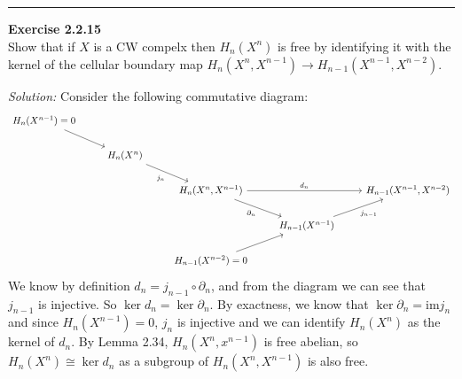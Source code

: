 \documentclass[a4paper, 12pt]{article}
\newenvironment{problem}[2][Exercise]
    { \begin{mdframed}[backgroundcolor=gray!20] \textbf{#1 #2} \\}
    {  \end{mdframed}}
\newenvironment{solution}
    {\textit{Solution:}}
    {}
\begin{document}
\noindent\rule{7in}{2.8pt}
\begin{problem}{2.2.15}
Show that if \(X\) is a CW compelx then \(H_n(X^n)\) is free by identifying it with the kernel of the cellular boundary map \(H_n(X^n,X^{n-1})\rightarrow H_{n-1}(X^{n-1},X^{n-2})\).	
\end{problem}
\begin{solution}
Consider the following commutative diagram:
\[\begin{tikzcd}
	{H_n(X^{n-1})=0} \\
	& {H_n(X^n)} \\
	&& {H_n(X^n,X^{n-1})} && {H_{n-1}(X^{n-1},X^{n-2})} \\
	&&& {H_{n-1}(X^{n-1})} \\
	&& {H_{n-1}(X^{n-2})=0}
	\arrow[from=1-1, to=2-2]
	\arrow["{j_n}"', from=2-2, to=3-3]
	\arrow["{d_n}", from=3-3, to=3-5]
	\arrow["{\partial_n}"', from=3-3, to=4-4]
	\arrow["{j_{n-1}}"', from=4-4, to=3-5]
	\arrow[from=5-3, to=4-4]
\end{tikzcd}\]
We know by definition \(d_n=j_{n-1}\circ \partial_n\), and from the diagram we can see that \(j_{n-1}\) is injective. So \(\ker d_n=\ker \partial_n\). By exactness, we know that 
\(\ker \partial_n=\text{im} j_n\) and since \(H_n(X^{n-1})=0\), \(j_n\) is injective and we can identify \(H_n(X^n)\) as the kernel of \(d_n\). By Lemma 2.34, \(H_n(X^n,x^{n-1})\) is free abelian, so 
\(H_n(X^n)\cong \ker d_n\) as a subgroup of \(H_n(X^n,X^{n-1})\) is also free.
\end{solution}
\end{document}
